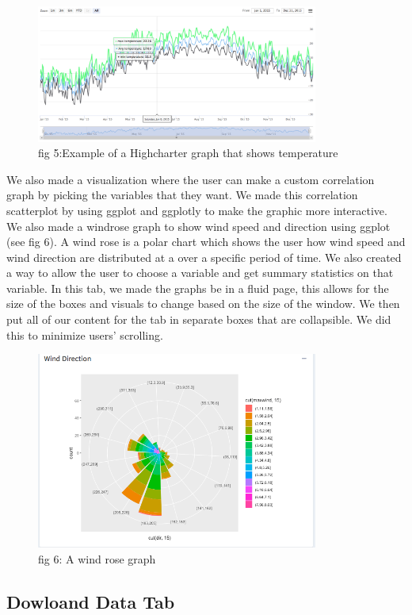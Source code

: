 \documentclass[10pt,letterpaper]{article}
\begin{document}
\begin{figure}
\includegraphics[width=350px]{highchart} \caption{fig 5:Example of a Highcharter graph that shows temperature}\label{fig:unnamed-chunk-5}
\end{figure}

We also made a visualization where the user can make a custom
correlation graph by picking the variables that they want. We made this
correlation scatterplot by using ggplot and ggplotly to make the graphic
more interactive. We also made a windrose graph to show wind speed and
direction using ggplot (see fig 6). A wind rose is a polar chart which
shows the user how wind speed and wind direction are distributed at a
over a specific period of time. We also created a way to allow the user
to choose a variable and get summary statistics on that variable. In
this tab, we made the graphs be in a fluid page, this allows for the
size of the boxes and visuals to change based on the size of the window.
We then put all of our content for the tab in separate boxes that are
collapsible. We did this to minimize users' scrolling.

\begin{figure}
\includegraphics[width=350px]{WindRose} \caption{fig 6: A wind rose graph}\label{fig:unnamed-chunk-6}
\end{figure}

\subsection{Dowloand Data Tab}\label{dowloand-data-tab}
\end{document}
